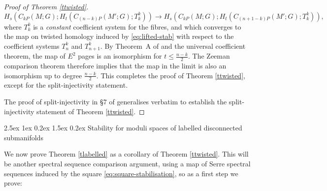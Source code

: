 \documentclass[reqno,a4paper]{article}
\makeatletter
\numberwithin{equation}{section}
\theoremstyle{italicised}
\theoremstyle{upright}
\theoremstyle{italicised-restate}
\renewcommand*{\section}{\@startsection{section}{1}{\z@}%
	{2.5ex \@plus 1ex \@minus 0.2ex}%
	{1.5ex \@plus 0.2ex}%
	{\normalfont\large\bfseries}}
\renewcommand{\leq}{\leqslant}
\makeatother
\begin{document}
\begin{proof}[Proof of Theorem \ref{ttwisted}]
\[
H_s(C_{kP}(M;G);H_t(C_{(n-k)P}(M';G);T_k^k)) \longrightarrow H_s(C_{kP}(M;G);H_t(C_{(n+1-k)P}(M';G);T_k^k)),
\]
where $T_k^k$ is a \emph{constant} coefficient system for the fibres, and which converges to the map on twisted homology induced by \eqref{eq:lifted-stab} with respect to the coefficient systems $T_n^k$ and $T_{n+1}^k$. By Theorem~A of \cite{Palmer2018HomologicalstabilitymoduliI} and the universal coefficient theorem, the map of $E^2$ pages is an isomorphism for $t \leq \tfrac{n-k}{2}$. The Zeeman comparison theorem therefore implies that the map in the limit is also an isomorphism up to degree $\tfrac{n-k}{2}$. This completes the proof of Theorem \ref{ttwisted}, except for the split-injectivity statement.

The proof of split-injectivity in \S 7 of \cite{Palmer2018Twistedhomologicalstability} generalises verbatim to establish the split-injectivity statement of Theorem \ref{ttwisted}.
\end{proof}


\section{Stability for moduli spaces of labelled disconnected submanifolds}\label{s:proof-labelled}


We now prove Theorem \ref{tlabelled} as a corollary of Theorem \ref{ttwisted}. This will be another spectral sequence comparison argument, using a map of Serre spectral sequences induced by the square \eqref{eq:square-stabilisation}, so as a first step we prove:
\end{document}
